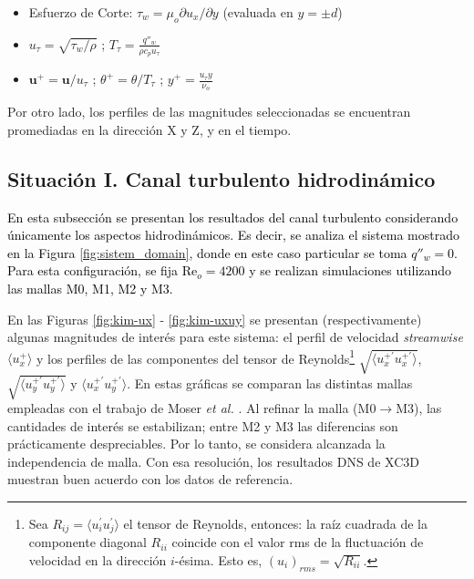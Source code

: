 \begin{itemize}
	\item Esfuerzo de Corte: $\tau_w= \mu_o \partial u_x / \partial y$ (evaluada en $y=\pm d$)  
	\item $u_{\tau} = \sqrt{\tau_w / \rho}$ ; $T_{\tau}=\frac{q''_w}{\rho c_p u_{\tau}}$
	\item $\mathbf{u}^+ = \mathbf{u} / u_{\tau}$ ; $\theta^+ = \theta / T_{\tau}$ ; $y^+ = \frac{u_{\tau} y}{\nu_o}$
\end{itemize}
Por otro lado, los perfiles de las magnitudes seleccionadas se encuentran promediadas en la dirección X y Z, y en el tiempo.

\subsection{Situación I. Canal turbulento hidrodinámico}


\textcolor{black}{En esta subsección se presentan los resultados del canal turbulento considerando únicamente los aspectos hidrodinámicos. Es decir, se analiza el sistema mostrado en la Figura \ref{fig:sistem_domain}, donde en este caso particular se toma $q''_w = 0$. Para esta configuración, se fija Re$_o = 4200$ y se realizan simulaciones utilizando las mallas M0, M1, M2 y M3.}

En las Figuras \ref{fig:kim-ux} - \ref{fig:kim-uxuy} se presentan (respectivamente) algunas magnitudes de interés para este sistema: el perfil de velocidad \textit{streamwise} $\langle u^+_x \rangle$ y los perfiles de las componentes del tensor de Reynolds\footnote{Sea $R_{ij} = \langle u^{\prime}_i u^{\prime}_j \rangle$ el tensor de Reynolds, entonces: la raíz cuadrada de la componente diagonal $R_{ii}$ coincide con el valor rms de la fluctuación de velocidad en la dirección $i$-ésima. Esto es, $(u_i)_{rms} = \sqrt{R_{ii}}$.} $\sqrt{\langle u^{+ \prime}_x u^{+ \prime}_x \rangle}$, $\sqrt{\langle u^{+ \prime}_y u^{+ \prime}_y \rangle}$ y $\langle u^{+ \prime}_x u^{+ \prime}_y \rangle$. En estas gráficas se comparan las distintas mallas empleadas con el trabajo de Moser \textit{et al.} \cite{moser1999}. Al refinar la malla (M0$\rightarrow$M3), las cantidades de interés se estabilizan; entre M2 y M3 las diferencias son prácticamente despreciables. Por lo tanto, se considera alcanzada la independencia de malla. Con esa resolución, los resultados DNS de XC3D muestran buen acuerdo con los datos de referencia.

